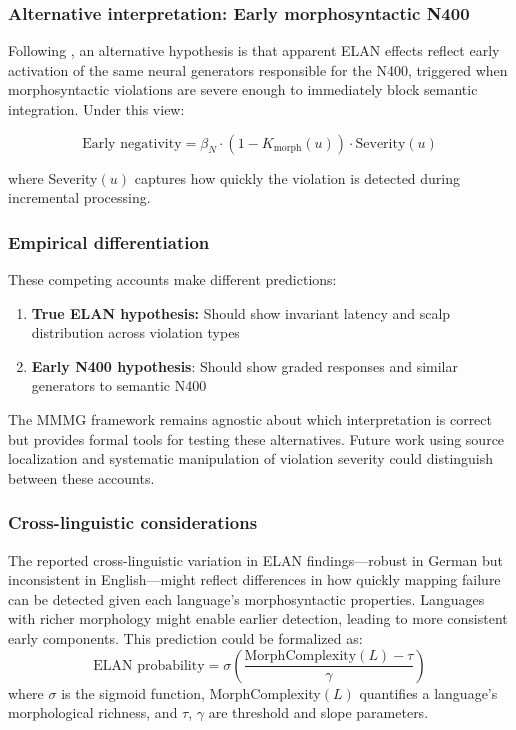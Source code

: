 \documentclass[12pt,letterpaper]{article}
\begin{document}
\subsubsection{Alternative interpretation: Early morphosyntactic N400}

Following \textcite{Steinhauer2012}, an alternative hypothesis is that apparent ELAN effects reflect early activation of the same neural generators responsible for the N400, triggered when morphosyntactic violations are severe enough to immediately block semantic integration. Under this view:

\[
\text{Early negativity} = \beta_N \cdot (1 - K_{\text{morph}}(u)) \cdot \text{Severity}(u)
\]

where Severity$(u)$ captures how quickly the violation is detected during incremental processing.

\subsubsection{Empirical differentiation}

These competing accounts make different predictions:
\begin{enumerate}
    \item \textbf{True ELAN hypothesis:} Should show invariant latency and scalp distribution across violation types
    \item \textbf{Early N400 hypothesis}: Should show graded responses and similar generators to semantic N400
\end{enumerate}

The MMMG framework remains agnostic about which interpretation is correct but provides formal tools for testing these alternatives. Future work using source localization and systematic manipulation of violation severity could distinguish between these accounts.

\subsubsection{Cross-linguistic considerations}

The reported cross-linguistic variation in ELAN findings—robust in German but inconsistent in English—might reflect differences in how quickly mapping failure can be detected given each language's morphosyntactic properties. Languages with richer morphology might enable earlier detection, leading to more consistent early components. This prediction could be formalized as:
\[
\text{ELAN probability} = \sigma\left(\frac{\text{MorphComplexity}(L) - \tau}{\gamma}\right)
\]
where $\sigma$ is the sigmoid function, MorphComplexity$(L)$ quantifies a language's morphological richness, and $\tau$, $\gamma$ are threshold and slope parameters.
\end{document}
